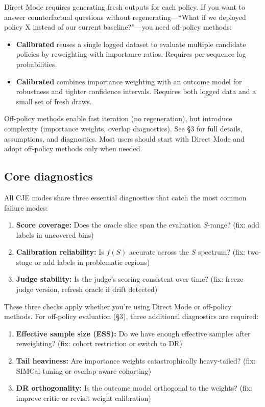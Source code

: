 Direct Mode requires generating fresh outputs for each policy. If you want to answer counterfactual questions without regenerating---``What if we deployed policy X instead of our current baseline?''---you need off-policy methods:

\begin{itemize}
\item \textbf{Calibrated \ips{}} reuses a single logged dataset to evaluate multiple candidate policies by reweighting with importance ratios. Requires per-sequence log probabilities.

\item \textbf{Calibrated \dr{}} combines importance weighting with an outcome model for robustness and tighter confidence intervals. Requires both logged data and a small set of fresh draws.
\end{itemize}

Off-policy methods enable fast iteration (no regeneration), but introduce complexity (importance weights, overlap diagnostics). See §3 for full details, assumptions, and diagnostics. Most users should start with Direct Mode and adopt off-policy methods only when needed.

\subsection{Core diagnostics}

All CJE modes share three essential diagnostics that catch the most common failure modes:

\begin{enumerate}[label=(\alph*)]
\item \textbf{Score coverage:} Does the oracle slice span the evaluation $S$-range? (fix: add labels in uncovered bins)

\item \textbf{Calibration reliability:} Is $f(S)$ accurate across the $S$ spectrum? (fix: two-stage \autocal{} or add labels in problematic regions)

\item \textbf{Judge stability:} Is the judge's scoring consistent over time? (fix: freeze judge version, refresh oracle if drift detected)
\end{enumerate}

These three checks apply whether you're using Direct Mode or off-policy methods. For off-policy evaluation (§3), three additional diagnostics are required:

\begin{enumerate}[label=(\alph*),resume]
\item \textbf{Effective sample size (ESS):} Do we have enough effective samples after reweighting? (fix: cohort restriction or switch to DR)

\item \textbf{Tail heaviness:} Are importance weights catastrophically heavy-tailed? (fix: SIMCal tuning or overlap-aware cohorting)

\item \textbf{DR orthogonality:} Is the outcome model orthogonal to the weights? (fix: improve critic or revisit weight calibration)
\end{enumerate}

